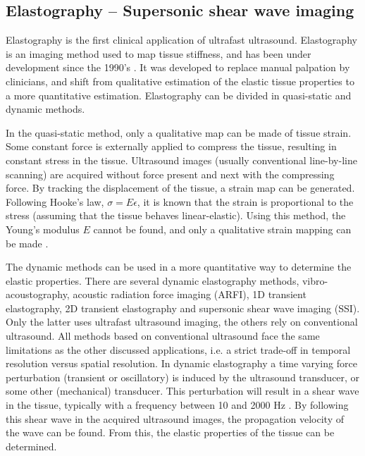 \subsection{Elastography -- Supersonic shear wave imaging}
\label{sec:us_ssi}
Elastography is the first clinical application of ultrafast ultrasound. Elastography is an imaging method used to map tissue stiffness, and has been under development since the 1990's \cite{gennisson_ultrasound_2013}. It was developed to replace manual palpation by clinicians, and shift from qualitative estimation of the elastic tissue properties to a more quantitative estimation. Elastography can be divided in quasi-static and dynamic methods. 

In the quasi-static method, only a qualitative map can be made of tissue strain. Some constant force is externally applied to compress the tissue, resulting in constant stress in the tissue. Ultrasound images (usually conventional line-by-line scanning) are acquired without force present and next with the compressing force. By tracking the displacement of the tissue, a strain map can be generated. Following Hooke's law, $\sigma = E \epsilon$, it is known that the strain is proportional to the stress (assuming that the tissue behaves linear-elastic). Using this method, the Young's modulus $E$ cannot be found, and only a qualitative strain mapping can be made \cite{gennisson_ultrasound_2013}. 

The dynamic methods can be used in a more quantitative way to determine the elastic properties. There are several dynamic elastography methods, vibro-acoustography, acoustic radiation force imaging (ARFI), 1D transient elastography, 2D transient elastography and supersonic shear wave imaging (SSI). Only the latter uses ultrafast ultrasound imaging, the others rely on conventional ultrasound. All methods based on conventional ultrasound face the same limitations as the other discussed applications, i.e. a strict trade-off in temporal resolution versus spatial resolution. %
In dynamic elastography a time varying force perturbation (transient or oscillatory) is induced by the ultrasound transducer, or some other (mechanical) transducer. This perturbation will result in a shear wave in the tissue, typically with a frequency between 10 and 2000 \si{\hertz} \cite{gennisson_ultrasound_2013}. By following this shear wave in the acquired ultrasound images, the propagation velocity of the wave can be found. From this, the elastic properties of the tissue can be determined.

